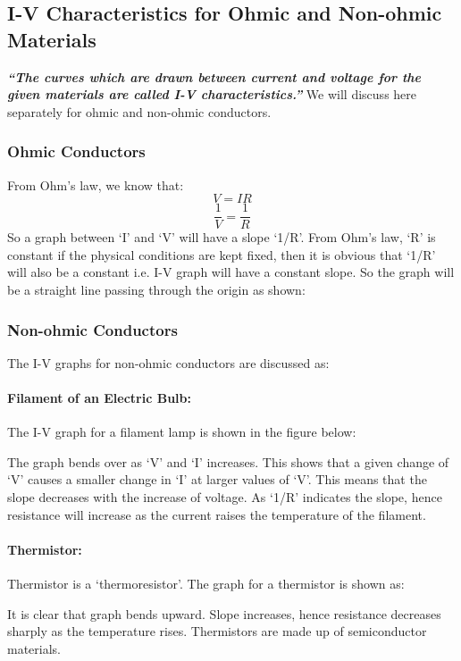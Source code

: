 \subsection{I-V Characteristics for Ohmic and Non-ohmic Materials}
\textit{\textbf{``The curves which are drawn between current and
voltage for the  given materials are called I-V characteristics.”}}
We will discuss here separately for ohmic and non-ohmic conductors.
\subsubsection{Ohmic Conductors}
From Ohm’s law, we know that:
\begin{equation}\nonumber
{V=IR}
\end{equation}
\begin{equation}\nonumber
\frac{1}{V} = \frac{1}{R}
\end{equation}
So a graph between `I' and `V' will have a slope `1/R’. From Ohm’s law, ‘R’
is constant if the physical conditions are kept fixed, then it is obvious
that ‘1/R’ will also be a constant i.e. I-V graph will have a constant slope. So the graph will be a straight line passing through the origin as shown:  
 
\subsubsection{Non-ohmic Conductors}
The I-V graphs for non-ohmic conductors are discussed as:

\paragraph{Filament of an Electric Bulb:}
The I-V graph for a filament lamp is shown in the figure below:

The graph bends over as ‘V’ and ‘I’ increases. This shows that a given change of ‘V’ causes a smaller change in ‘I’ at larger values of ‘V’. This means that the slope decreases with the increase of voltage. As ‘1/R’ indicates the slope, hence resistance will increase as the current raises the temperature of the filament.
\paragraph{Thermistor:}
Thermistor is a ‘thermoresistor’. The graph for a thermistor is shown as:

It is clear that graph bends upward. Slope increases, hence resistance decreases sharply as the temperature rises. Thermistors are made up of semiconductor materials.
